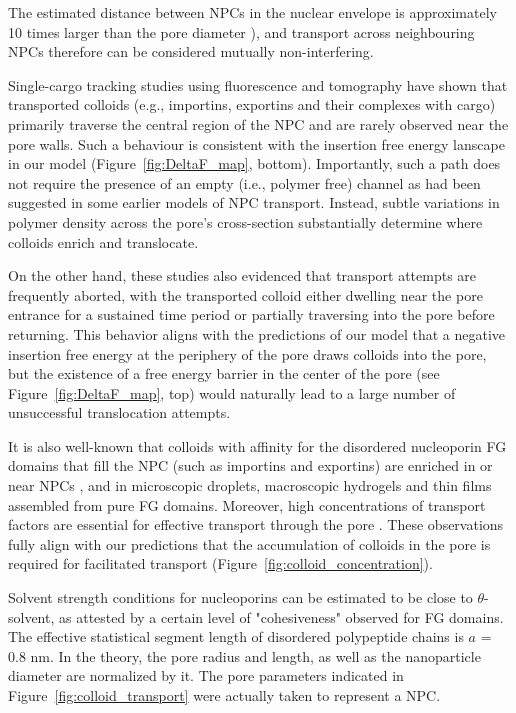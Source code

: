 \documentclass[12pt, a4paper]{article}
\begin{document}
The estimated distance between NPCs in the nuclear envelope is approximately 10 times larger than the pore diameter \cite{Yang2004, Daigle2001, Feldherr1984, Kubitscheck2000}), and transport across neighbouring NPCs therefore can be considered mutually non-interfering. 

Single-cargo tracking studies using fluorescence \cite{Musser2016, Lowe2010, Lowe2015, Yang2004, Kubitscheck2000, Ma2010} and tomography \cite{Beck2007} have shown that transported colloids (e.g., importins, exportins and their complexes with cargo) primarily traverse the central region of the NPC and are rarely observed near the pore walls.
Such a behaviour is consistent with the  insertion free energy lanscape in our model (Figure~\ref{fig:DeltaF_map}, bottom).
Importantly, such a path does not require the presence of an empty (i.e., polymer free) channel as had been suggested in some earlier models of NPC transport. Instead, subtle variations in polymer density across the pore's cross-section substantially determine where colloids enrich and translocate.  

On the other hand, these studies also evidenced that transport attempts are frequently aborted, with the transported colloid either dwelling near the pore entrance for a sustained time period or partially traversing into the pore before returning.
This behavior aligns with the predictions of our model that a negative insertion free energy at the periphery of the pore draws colloids into the pore, but the existence of a free energy barrier in the center of the pore (see Figure~\ref{fig:DeltaF_map}, top) would naturally lead to a large number of unsuccessful translocation attempts.

It is also well-known that colloids with affinity for the disordered nucleoporin FG domains that fill the NPC (such as importins and exportins) are enriched in or near NPCs \cite{Beck2007, Gruenwald2010, Tu2011}, and in microscopic droplets, macroscopic hydrogels and thin films assembled from pure FG domains.
Moreover, high concentrations of transport factors are essential for effective transport through the pore \cite{Lowe2015}.
These observations fully align with our predictions that the accumulation of colloids in the pore is required for facilitated transport (Figure~\ref{fig:colloid_concentration}).

Solvent strength conditions for nucleoporins can be estimated to be close to $\theta$-solvent, as attested by a certain level of "cohesiveness" observed for FG domains. 
The effective statistical segment length of disordered polypeptide chains is $a$ = 0.8 nm. In the theory, the pore radius and length, as well as the nanoparticle diameter are normalized by it. The pore parameters indicated in Figure~\ref{fig:colloid_transport} were actually taken to represent a NPC.
\end{document}
